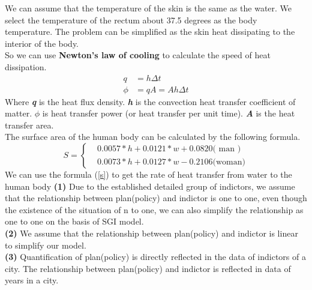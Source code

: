 \documentclass{mcmthesis}
\begin{document}
\indent We can assume that the temperature of the skin is the same as the water. We select the temperature of the rectum about 37.5 degrees as the body temperature. The problem can be simplified as the skin heat dissipating to the interior of the body.\\
\indent So we can use {\bf Newton's law of cooling} to calculate the speed of heat dissipation.\\
\begin{equation}
\begin{split}
q&=h\Delta t	\\
\phi &=qA=Ah\Delta t
\end{split}
\end{equation}
\indent Where \textbf{\emph{q}} is the heat flux density. \textbf{\emph{h}} is the convection heat transfer coefficient of matter. \textbf{\emph{$\phi$}}  is heat transfer power (or heat transfer per unit time). \textbf{\emph{A}} is the heat transfer area.\\
\indent The surface area of the human body can be calculated by the following formula.
\begin{equation}
S= \begin{cases} & 0.0057*h+0.0121*w+0.0820\text{( man )} \\ & 0.0073*h+0.0127*w-0.2106\text{(woman)} \end{cases}
\label{s}
\end{equation}
\indent We can use the formula (\ref{s}) to get the rate of heat transfer from water to the human body
\indent 
\noindent
{\bf (1) } Due to the established detailed group of indictors, we assume that the relationship between plan(policy) and indictor is one to one, even though the existence of the situation of n to one, we can also simplify the relationship as one to one on the basis of SGI model.\\
{\bf (2) } We assume that the relationship between plan(policy) and indictor is linear to simplify our model.\\
{\bf (3) }Quantification of plan(policy) is directly reflected in the data of indictors of a city.
The relationship between plan(policy) and indictor is reflected in data of years in a city.\\
\end{document}
